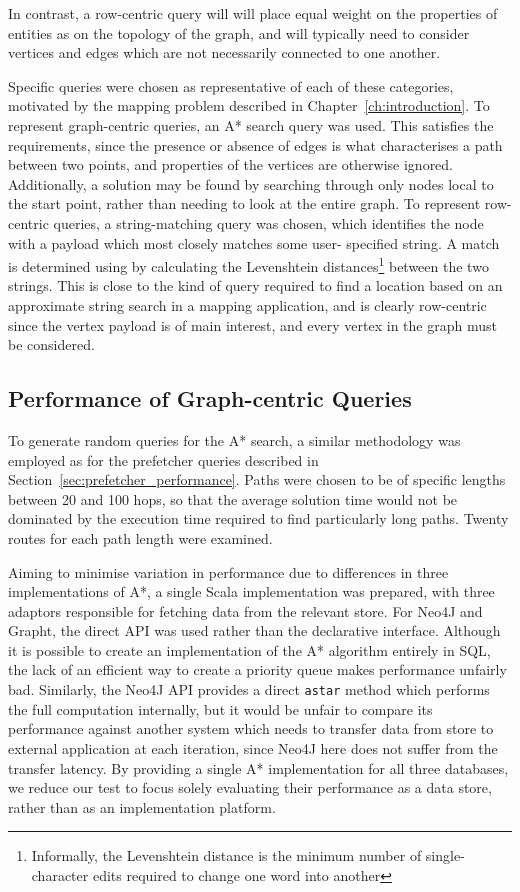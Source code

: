 In contrast, a row-centric query will will place equal weight on the
properties of entities as on the topology of the graph, and will typically
need to consider vertices and edges which are not necessarily connected to one
another. 

Specific queries were chosen as representative of each of these categories,
motivated by the mapping problem described in Chapter~\ref{ch:introduction}.
To represent graph-centric queries, an A* search query was used. This
satisfies the requirements, since the presence or absence of edges is what
characterises a path between two points, and properties of the vertices are
otherwise ignored. Additionally, a solution may be found by searching through
only nodes local to the start point, rather than needing to look at the entire
graph. To represent row-centric queries, a string-matching query was chosen,
which identifies the node with a payload which most closely matches some user-
specified string. A match is determined using by calculating the Levenshtein
distances\footnote{Informally, the Levenshtein distance is the minimum number
of single-character edits required to change one word into another} between
the two strings.  This is close to the kind of  query required to find a
location based on an approximate string search in a mapping application, and
is clearly row-centric since the vertex payload is of main interest, and
every vertex in the graph must be considered.


\subsection{Performance of Graph-centric Queries} %
\label{sub:performance_of_graph_centric_queries}

To generate random queries for the A* search, a similar methodology was
employed as for the prefetcher queries described in
Section~\ref{sec:prefetcher_performance}.  Paths were chosen to be of specific
lengths between 20 and 100 hops, so that the average solution time would not
be dominated by the execution time required to find particularly long paths.
Twenty routes for each path length were examined.

Aiming to minimise variation in performance due to differences in three
implementations of A*, a single Scala implementation was prepared, with three
adaptors responsible for fetching data from the relevant store. For Neo4J and
Grapht, the direct API was used rather than the declarative interface.
Although it is possible to create an implementation of the A* algorithm
entirely in SQL, the lack of an efficient way to create a priority queue makes
performance unfairly bad. Similarly, the Neo4J API provides a direct
\texttt{astar} method which performs the full computation internally, but it
would be unfair to compare its performance against another system which needs
to transfer data from store to external application at each iteration, since
Neo4J here does not suffer from the transfer latency. By providing a single A*
implementation for all three databases, we reduce our test to focus solely
evaluating their performance as a data store, rather than as an implementation
platform.

